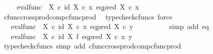 \begin{isabellebody}
\ \isamarkupfalse%
\ {\isachardoublequoteopen}{\isachardot}{\kern0pt}{\isachardot}{\kern0pt}{\isachardot}{\kern0pt}\ {\isacharequal}{\kern0pt}\ {\isacharparenleft}{\kern0pt}eval{\isacharunderscore}{\kern0pt}func\ {\isasymOmega}\ X{\isacharparenright}{\kern0pt}\ {\isasymcirc}\isactrlsub c\ {\isasymlangle}id\ X\ {\isasymcirc}\isactrlsub c\ x{\isacharcomma}{\kern0pt}\ {\isacharparenleft}{\kern0pt}eq{\isacharunderscore}{\kern0pt}pred\ X\isactrlsup {\isasymsharp}{\isacharparenright}{\kern0pt}\ {\isasymcirc}\isactrlsub c\ x{\isasymrangle}{\isachardoublequoteclose}\isanewline
\ \ \ \ \ \ \ \ \isamarkupfalse%
\ cfunc{\isacharunderscore}{\kern0pt}cross{\isacharunderscore}{\kern0pt}prod{\isacharunderscore}{\kern0pt}comp{\isacharunderscore}{\kern0pt}cfunc{\isacharunderscore}{\kern0pt}prod\ \isamarkupfalse%
\ {\isacharparenleft}{\kern0pt}typecheck{\isacharunderscore}{\kern0pt}cfuncs{\isacharcomma}{\kern0pt}\ force{\isacharparenright}{\kern0pt}\isanewline
\ \ \ \ \ \ \isamarkupfalse%
\ \isamarkupfalse%
\ {\isachardoublequoteopen}{\isachardot}{\kern0pt}{\isachardot}{\kern0pt}{\isachardot}{\kern0pt}\ {\isacharequal}{\kern0pt}\ {\isacharparenleft}{\kern0pt}eval{\isacharunderscore}{\kern0pt}func\ {\isasymOmega}\ X{\isacharparenright}{\kern0pt}\ {\isasymcirc}\isactrlsub c\ {\isasymlangle}id\ X\ {\isasymcirc}\isactrlsub c\ x{\isacharcomma}{\kern0pt}\ {\isacharparenleft}{\kern0pt}eq{\isacharunderscore}{\kern0pt}pred\ X\isactrlsup {\isasymsharp}{\isacharparenright}{\kern0pt}\ {\isasymcirc}\isactrlsub c\ y{\isasymrangle}{\isachardoublequoteclose}\isanewline
\ \ \ \ \ \ \ \ \isamarkupfalse%
\ {\isacharparenleft}{\kern0pt}simp\ add{\isacharcolon}{\kern0pt}\ eq{\isacharparenright}{\kern0pt}\isanewline
\ \ \ \ \ \ \isamarkupfalse%
\ \isamarkupfalse%
\ {\isachardoublequoteopen}{\isachardot}{\kern0pt}{\isachardot}{\kern0pt}{\isachardot}{\kern0pt}\ {\isacharequal}{\kern0pt}\ {\isacharparenleft}{\kern0pt}eval{\isacharunderscore}{\kern0pt}func\ {\isasymOmega}\ X{\isacharparenright}{\kern0pt}\ {\isasymcirc}\isactrlsub c\ {\isacharparenleft}{\kern0pt}id\ X\ {\isasymtimes}\isactrlsub f\ {\isacharparenleft}{\kern0pt}eq{\isacharunderscore}{\kern0pt}pred\ X\isactrlsup {\isasymsharp}{\isacharparenright}{\kern0pt}{\isacharparenright}{\kern0pt}\ {\isasymcirc}\isactrlsub c\ {\isasymlangle}x{\isacharcomma}{\kern0pt}\ y{\isasymrangle}{\isachardoublequoteclose}\isanewline
\ \ \ \ \ \ \ \ \isamarkupfalse%
\ {\isacharparenleft}{\kern0pt}typecheck{\isacharunderscore}{\kern0pt}cfuncs{\isacharcomma}{\kern0pt}\ simp\ add{\isacharcolon}{\kern0pt}\ cfunc{\isacharunderscore}{\kern0pt}cross{\isacharunderscore}{\kern0pt}prod{\isacharunderscore}{\kern0pt}comp{\isacharunderscore}{\kern0pt}cfunc{\isacharunderscore}{\kern0pt}prod{\isacharparenright}{\kern0pt}\isanewline

\end{isabellebody}

